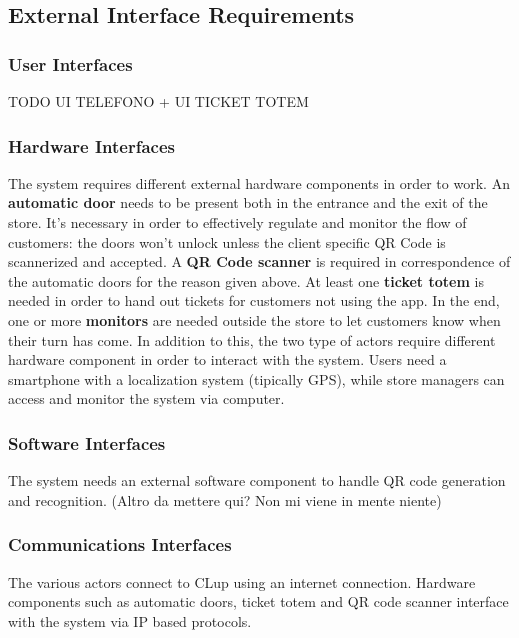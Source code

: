 \documentclass[]{article}
\begin{document}
		\subsection{External Interface Requirements}
			\subsubsection{User Interfaces}
			TODO UI TELEFONO + UI TICKET TOTEM
			\subsubsection{Hardware Interfaces}
			The system requires different external hardware components in order to work. \newline
			An \textbf{automatic door} needs to be present both in the entrance and the exit of the store. It's necessary in order to effectively regulate and monitor the flow of customers: the doors won't unlock unless the client specific QR Code is scannerized and accepted. \newline
			A \textbf{QR Code scanner} is required in correspondence of the automatic doors for the reason given above. \newline
			At least one \textbf{ticket totem} is needed in order to hand out tickets for customers not using the app. \newline
			In the end, one or more \textbf{monitors} are needed outside the store to let customers know when their turn has come. \newline \newline
			In addition to this, the  two type of actors require different hardware component in order to interact with the system. \newline
			Users need a smartphone with a localization system (tipically GPS), while store managers can access and monitor the system via computer.
			\subsubsection{Software Interfaces}
			The system needs an external software component to handle QR code generation and recognition. \newline (Altro da mettere qui? Non mi viene in mente niente)
			\subsubsection{Communications Interfaces}
			The various actors connect to CLup using an internet connection. \newline
			Hardware components such as automatic doors, ticket totem and QR code scanner interface with the system via IP based protocols.
\end{document}
